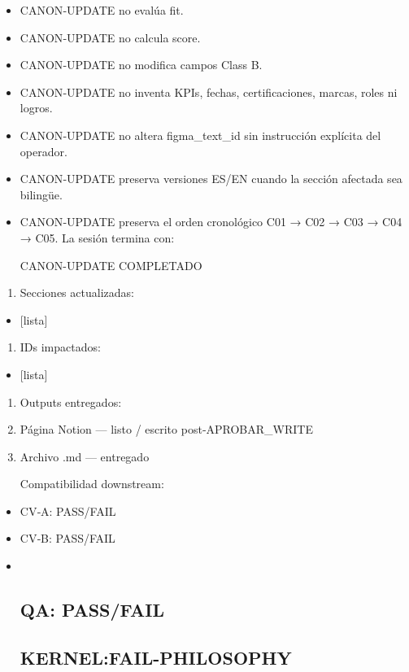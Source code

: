 \documentclass[
]{article}
\providecommand{\tightlist}{%
  \setlength{\itemsep}{0pt}\setlength{\parskip}{0pt}}
\begin{document}
\begin{itemize}
\tightlist
\item
  CANON‑UPDATE no evalúa fit.
\item
  CANON‑UPDATE no calcula score.
\item
  CANON‑UPDATE no modifica campos Class B.
\item
  CANON‑UPDATE no inventa KPIs, fechas, certificaciones, marcas, roles
  ni logros.
\item
  CANON‑UPDATE no altera figma\_text\_id sin instrucción explícita del
  operador.
\item
  CANON‑UPDATE preserva versiones ES/EN cuando la sección afectada sea
  bilingüe.
\item
  CANON‑UPDATE preserva el orden cronológico C01 → C02 → C03 → C04 →
  C05. La sesión termina con:

  CANON-UPDATE COMPLETADO
\end{itemize}

\begin{enumerate}
\def\labelenumi{\arabic{enumi}.}
\tightlist
\item
  Secciones actualizadas:
\end{enumerate}

\begin{itemize}
\tightlist
\item
  {[}lista{]}
\end{itemize}

\begin{enumerate}
\def\labelenumi{\arabic{enumi}.}
\tightlist
\item
  IDs impactados:
\end{enumerate}

\begin{itemize}
\tightlist
\item
  {[}lista{]}
\end{itemize}

\begin{enumerate}
\def\labelenumi{\arabic{enumi}.}
\tightlist
\item
  Outputs entregados:
\item
  Página Notion --- listo / escrito post‑APROBAR\_WRITE
\item
  Archivo .md --- entregado

  Compatibilidad downstream:
\end{enumerate}

\begin{itemize}
\item
  CV‑A: PASS/FAIL
\item
  CV‑B: PASS/FAIL
\item ~
  \subsection{QA: PASS/FAIL}\label{qa-passfail}

  \subsection{KERNEL:FAIL-PHILOSOPHY}\label{kernelfail-philosophy}
\end{itemize}
\end{document}
